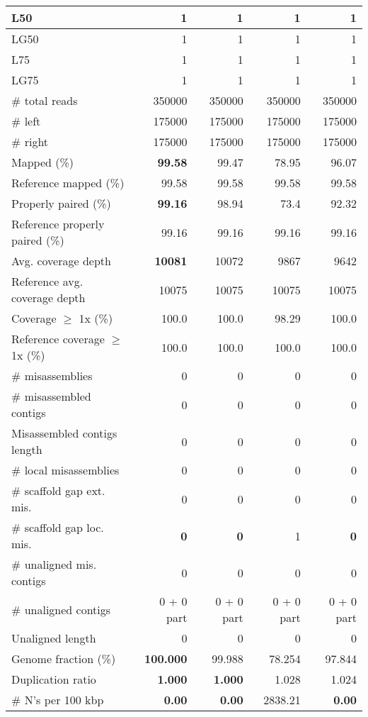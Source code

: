 \documentclass[12pt,a4paper]{article}
\begin{document}
\begin{table}[ht]
\begin{center}
\begin{tabular}{|l*{4}{|r}|}
L50 & 1 & 1 & 1 & 1 \\ \hline
LG50 & 1 & 1 & 1 & 1 \\ \hline
L75 & 1 & 1 & 1 & 1 \\ \hline
LG75 & 1 & 1 & 1 & 1 \\ \hline
\# total reads & 350000 & 350000 & 350000 & 350000 \\ \hline
\# left & 175000 & 175000 & 175000 & 175000 \\ \hline
\# right & 175000 & 175000 & 175000 & 175000 \\ \hline
Mapped (\%) & {\bf 99.58} & 99.47 & 78.95 & 96.07 \\ \hline
Reference mapped (\%) & 99.58 & 99.58 & 99.58 & 99.58 \\ \hline
Properly paired (\%) & {\bf 99.16} & 98.94 & 73.4 & 92.32 \\ \hline
Reference properly paired (\%) & 99.16 & 99.16 & 99.16 & 99.16 \\ \hline
Avg. coverage depth & {\bf 10081} & 10072 & 9867 & 9642 \\ \hline
Reference avg. coverage depth & 10075 & 10075 & 10075 & 10075 \\ \hline
Coverage $\geq$ 1x (\%) & 100.0 & 100.0 & 98.29 & 100.0 \\ \hline
Reference coverage $\geq$ 1x (\%) & 100.0 & 100.0 & 100.0 & 100.0 \\ \hline
\# misassemblies & 0 & 0 & 0 & 0 \\ \hline
\# misassembled contigs & 0 & 0 & 0 & 0 \\ \hline
Misassembled contigs length & 0 & 0 & 0 & 0 \\ \hline
\# local misassemblies & 0 & 0 & 0 & 0 \\ \hline
\# scaffold gap ext. mis. & 0 & 0 & 0 & 0 \\ \hline
\# scaffold gap loc. mis. & {\bf 0} & {\bf 0} & 1 & {\bf 0} \\ \hline
\# unaligned mis. contigs & 0 & 0 & 0 & 0 \\ \hline
\# unaligned contigs & 0 + 0 part & 0 + 0 part & 0 + 0 part & 0 + 0 part \\ \hline
Unaligned length & 0 & 0 & 0 & 0 \\ \hline
Genome fraction (\%) & {\bf 100.000} & 99.988 & 78.254 & 97.844 \\ \hline
Duplication ratio & {\bf 1.000} & {\bf 1.000} & 1.028 & 1.024 \\ \hline
\# N's per 100 kbp & {\bf 0.00} & {\bf 0.00} & 2838.21 & {\bf 0.00} \\ \hline

\end{tabular}
\end{center}
\end{table}
\end{document}
